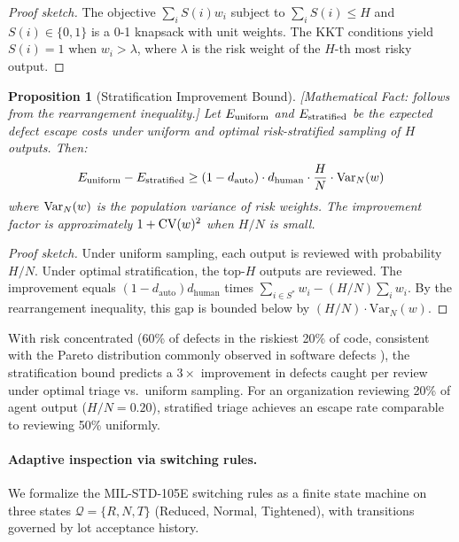 \documentclass[11pt, a4paper]{googledeepmind}
\newtheorem{proposition}{Proposition}[section]
\begin{document}
\begin{proof}[Proof sketch]
The objective $\sum_i S(i) w_i$ subject to $\sum_i S(i) \leq H$ and $S(i) \in \{0,1\}$ is a 0-1 knapsack with unit weights. The KKT conditions yield $S(i) = 1$ when $w_i > \lambda$, where $\lambda$ is the risk weight of the $H$-th most risky output.
\end{proof}

\begin{proposition}[Stratification Improvement Bound]
\emph{[Mathematical Fact: follows from the rearrangement inequality.]}
\label{thm:stratification}
Let $E_{\textup{uniform}}$ and $E_{\textup{stratified}}$ be the expected defect escape costs under uniform and optimal risk-stratified sampling of $H$ outputs. Then:
\begin{equation}
E_{\textup{uniform}} - E_{\textup{stratified}} \geq (1 - d_{\textup{auto}}) \cdot d_{\textup{human}} \cdot \frac{H}{N} \cdot \textup{Var}_N(w)
\end{equation}
where $\textup{Var}_N(w)$ is the population variance of risk weights. The improvement factor is approximately $1 + \textup{CV}(w)^2$ when $H/N$ is small.
\end{proposition}

\begin{proof}[Proof sketch]
Under uniform sampling, each output is reviewed with probability $H/N$. Under optimal stratification, the top-$H$ outputs are reviewed. The improvement equals $(1 - d_{\text{auto}}) d_{\text{human}}$ times $\sum_{i \in S^*} w_i - (H/N)\sum_i w_i$. By the rearrangement inequality, this gap is bounded below by $(H/N) \cdot \text{Var}_N(w)$.
\end{proof}

With risk concentrated (60\% of defects in the riskiest 20\% of code, consistent with the Pareto distribution commonly observed in software defects \citep{jones1996software}), the stratification bound predicts a $3\times$ improvement in defects caught per review under optimal triage vs.\ uniform sampling. For an organization reviewing 20\% of agent output ($H/N = 0.20$), stratified triage achieves an escape rate comparable to reviewing 50\% uniformly.

\paragraph{Adaptive inspection via switching rules.} We formalize the MIL-STD-105E switching rules \citep{milstd105e} as a finite state machine on three states $\mathcal{Q} = \{R, N, T\}$ (Reduced, Normal, Tightened), with transitions governed by lot acceptance history.
\end{document}
